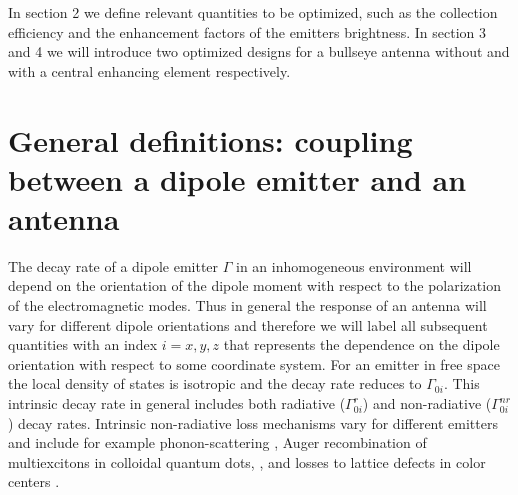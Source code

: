 \documentclass[10pt,onecolumn ]{article}
\begin{document}
In section 2 we define relevant quantities to be optimized, such as the collection efficiency and the enhancement factors of the emitters brightness. In section 3 and 4 we will introduce two optimized designs for a bullseye antenna without and with a central enhancing element respectively.

\section{General definitions: coupling between a dipole emitter and an antenna}
The decay rate of a dipole emitter $\Gamma$ in an inhomogeneous environment will depend on the orientation of the dipole moment with respect to the polarization of the electromagnetic modes. 
Thus in general the response of an antenna will vary for different dipole orientations and therefore we will label all subsequent quantities with an index $i= x,y,z$ that represents the dependence on the dipole orientation with respect to some coordinate system.
For an emitter in free space the local density of states is isotropic and the decay rate reduces to $\Gamma_{0i}$.
This intrinsic decay rate in general includes both radiative ($\Gamma_{0i}^r$) and non-radiative ($\Gamma_{0i}^{nr}$) decay rates.
Intrinsic non-radiative loss mechanisms vary for different emitters and include for example phonon-scattering \cite{Jagtap2015ExcitonphononDots}, Auger recombination of multiexcitons in colloidal quantum dots, \cite{Robel2009UniversalNanocrystals}, and losses to lattice defects in color centers \cite{Neu2012PhotophysicsEmission}.
\end{document}
